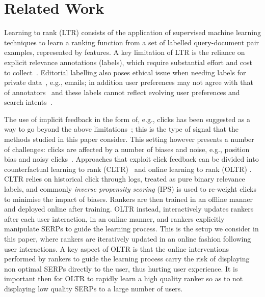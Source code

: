 \section{Related Work}

Learning to rank (LTR) consists of the application of supervised machine learning techniques to learn a ranking function from a set of labelled query-document pair examples, represented by features. A key limitation of LTR is the reliance on explicit relevance annotations (labels), which require substantial effort and cost to collect~\cite{DBLP:journals/corr/QinL13,DBLP:journals/jmlr/ChapelleC11}. Editorial labelling also poses ethical issue when needing labels for private data~\cite{wang2016learning}, e.g., emails; in addition user preferences may not agree with that of annotators~\cite{sanderson2010test} and these labels cannot reflect evolving user preferences and search intents~\cite{lefortier2014online}.

The use of implicit feedback in the form of, e.g., clicks has been suggested as a way to go beyond the above limitations~\cite{joachims2002optimizing}; this is the type of signal that the methods studied in this paper consider. 
This setting however presents a number of challenges: clicks are affected by a number of biases and noise, e.g., position bias and noisy clicks~\cite{guan2007eye,joachims2017unbiased,pan2007google}. Approaches that exploit click feedback can be divided into counterfactual learning to rank (CLTR)~\cite{joachims2017unbiased} and online learning to rank (OLTR) \cite{yue2009interactively}. CLTR relies on historical click through logs, treated as pure binary relevance labels, and commonly \textit{inverse propensity scoring} (IPS) is used to re-weight clicks to minimise the impact of biases. Rankers are then trained in an offline manner and deployed online after training. 
OLTR instead, interactively updates rankers after each user interaction, in an online manner, and rankers explicitly manipulate SERPs to guide the learning process. This is the setup we consider in this paper, where rankers are iteratively updated in an online fashion following user interactions. A key aspect of OLTR is that the online interventions performed by rankers to guide the learning process carry the risk of displaying non optimal SERPs directly to the user, thus hurting user experience. It is important then for OLTR to rapidly learn a high quality ranker so as to not displaying low quality SERPs to a large number of users.

